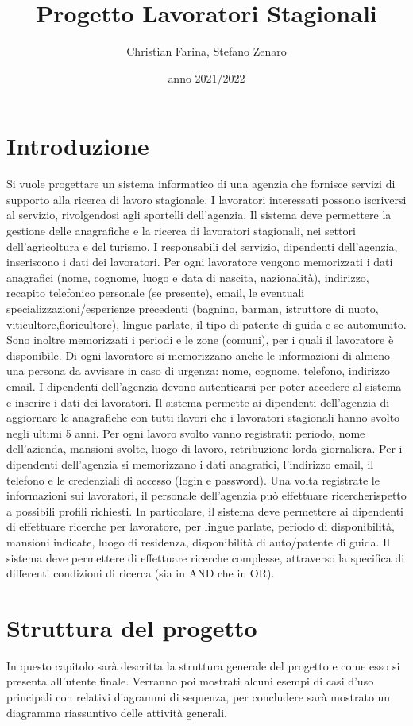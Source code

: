 \documentclass[ 4paper,11pt,openany]{book}
\title{Progetto Lavoratori Stagionali}
\author{Christian Farina,  Stefano Zenaro}
\date{anno 2021/2022}
\begin{document}
\frontmatter
\maketitle
\tableofcontents 

\mainmatter
\chapter{Introduzione}
Si vuole progettare un sistema informatico di una agenzia che fornisce servizi di supporto alla ricerca di lavoro stagionale. I lavoratori interessati possono iscriversi al servizio, rivolgendosi agli sportelli dell’agenzia. Il sistema deve permettere la gestione delle anagrafiche e la ricerca di lavoratori
stagionali, nei settori dell’agricoltura e del turismo. I responsabili del servizio, dipendenti dell’agenzia, inseriscono i dati dei lavoratori. 
Per ogni lavoratore vengono memorizzati i dati anagrafici (nome, cognome, luogo e data di nascita, nazionalità), indirizzo, recapito telefonico personale (se presente), email, le eventuali
specializzazioni/esperienze precedenti (bagnino, barman, istruttore di nuoto, viticultore,floricultore), lingue parlate, il tipo di patente di guida e se automunito. Sono inoltre memorizzati i periodi e le zone (comuni), per i quali il lavoratore è disponibile. Di ogni lavoratore si memorizzano anche le informazioni di almeno una persona da avvisare in caso di urgenza: nome, cognome, telefono, indirizzo email. I dipendenti dell’agenzia devono autenticarsi per poter accedere al sistema e inserire i dati dei lavoratori. Il sistema permette ai dipendenti dell’agenzia di aggiornare le anagrafiche con tutti ilavori che i lavoratori stagionali hanno svolto negli ultimi 5 anni. 
Per ogni lavoro svolto vanno registrati: periodo, nome dell’azienda, mansioni svolte, luogo di lavoro, retribuzione lorda giornaliera. Per i dipendenti dell’agenzia si memorizzano i dati anagrafici, l’indirizzo email, il telefono e le credenziali di accesso (login e password).
Una volta registrate le informazioni sui lavoratori, il personale dell’agenzia può effettuare ricercherispetto a possibili profili richiesti.
In particolare, il sistema deve permettere ai dipendenti di effettuare ricerche per lavoratore, per lingue parlate, periodo di disponibilità, mansioni indicate, luogo di residenza, disponibilità di auto/patente di guida. Il sistema deve permettere di effettuare ricerche complesse, attraverso la specifica di differenti condizioni di ricerca (sia in AND che in OR).
 
\chapter{Struttura del progetto}%
In questo capitolo sarà descritta la struttura generale del progetto e come esso si presenta all'utente finale. Verranno poi mostrati alcuni esempi di casi d'uso principali con relativi diagrammi di sequenza, per concludere sarà mostrato un diagramma riassuntivo delle attività generali.
\end{document}
